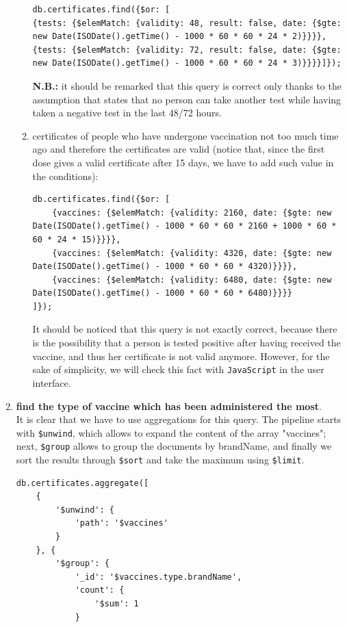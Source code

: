 \documentclass{article}
\begin{document}
\begin{enumerate}
\begin{enumerate}
    \begin{lstlisting}
db.certificates.find({$or: [
{tests: {$elemMatch: {validity: 48, result: false, date: {$gte: new Date(ISODate().getTime() - 1000 * 60 * 60 * 24 * 2)}}}}, 
{tests: {$elemMatch: {validity: 72, result: false, date: {$gte: new Date(ISODate().getTime() - 1000 * 60 * 60 * 24 * 3)}}}}]});
    \end{lstlisting}
    \textbf{N.B.:} it should be remarked that this query is correct only thanks to the assumption that states that no person can take another test while having taken a negative test in the last 48/72 hours.
    \item certificates of people who have undergone vaccination not too much time ago and therefore the certificates are valid (notice that, since the first dose gives a valid certificate after 15 days, we have to add such value in the conditions):
    \begin{lstlisting}
db.certificates.find({$or: [
    {vaccines: {$elemMatch: {validity: 2160, date: {$gte: new Date(ISODate().getTime() - 1000 * 60 * 60 * 2160 + 1000 * 60 * 60 * 24 * 15)}}}},
    {vaccines: {$elemMatch: {validity: 4320, date: {$gte: new Date(ISODate().getTime() - 1000 * 60 * 60 * 4320)}}}},
    {vaccines: {$elemMatch: {validity: 6480, date: {$gte: new Date(ISODate().getTime() - 1000 * 60 * 60 * 6480)}}}}
]});
    \end{lstlisting}
    It should be noticed that this query is not exactly correct, because there is the possibility that a person is tested positive after having received the vaccine, and thus her certificate is not valid anymore. However, for the sake of simplicity, we will check this fact with \verb|JavaScript| in the user interface.
    \end{enumerate}
    \item \textbf{find the type of vaccine which has been administered the most}.\\
    It is clear that we have to use aggregations for this query. The pipeline starts with \verb|$unwind|, which allows to expand the content of the array "vaccines"; next, \verb|$group| allows to group the documents by brandName, and finally we sort the results through \verb|$sort| and take the maximum using \verb|$limit|. 
    \begin{lstlisting}
db.certificates.aggregate([
    {
        '$unwind': {
            'path': '$vaccines'
        }
    }, {
        '$group': {
            '_id': '$vaccines.type.brandName', 
            'count': {
                '$sum': 1
            }

\end{lstlisting}
\end{enumerate}
\end{document}
